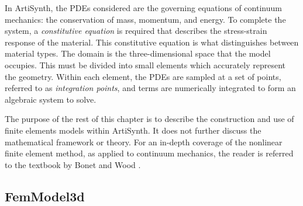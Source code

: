 In ArtiSynth, the PDEs considered are the governing equations of
continuum mechanics: the conservation of mass, momentum, and energy.  To 
complete the system, a \emph{constitutive equation} is required that describes
the stress-strain response of the material.  This constitutive equation is what
distinguishes between material types.  The domain is the three-dimensional space
that the model occupies. This must be divided into small elements which 
accurately represent the geometry. Within each element, the PDEs are
sampled at a set of points, referred to as \emph{integration points}, and 
terms are numerically integrated to form an algebraic system to solve.

The purpose of the rest of this chapter is to describe the construction and
use of finite elements models within ArtiSynth.  It does not further discuss 
the mathematical framework or theory.
For an in-depth coverage of the nonlinear finite element method, as applied
to continuum mechanics, the reader is referred to the textbook by Bonet and 
Wood \cite{bonet:fem:2000}.

\subsection{FemModel3d}
\label{sec:fem:structure}

